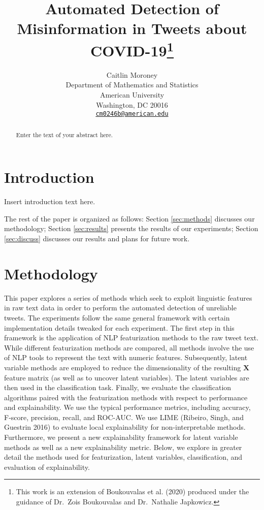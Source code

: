 \documentclass{article}
\title{Automated Detection of Misinformation in Tweets about COVID-19\footnote{This
  work is an extension of Boukouvalas et al. (2020) produced under the
  guidance of Dr.~Zois Boukouvalas and Dr.~Nathalie Japkowicz.}}
\author{
    Caitlin Moroney
   \\
    Department of Mathematics and Statistics \\
    American University \\
  Washington, DC 20016 \\
  \texttt{\href{mailto:cm0246b@american.edu}{\nolinkurl{cm0246b@american.edu}}} \\
  }
\begin{document}
\maketitle

\def\tightlist{}


\begin{abstract}
Enter the text of your abstract here.
\end{abstract}


\newpage

\hypertarget{introduction}{%
\section{Introduction}\label{introduction}}

Insert introduction text here.

The rest of the paper is organized as follows: Section \ref{sec:methods}
discusses our methodology; Section \ref{sec:results} presents the
results of our experiments; Section \ref{sec:discuss} discusses our
results and plans for future work.

\hypertarget{methodology}{%
\section{Methodology}\label{methodology}}

\label{sec:methods} This paper explores a series of methods which seek
to exploit linguistic features in raw text data in order to perform the
automated detection of unreliable tweets. The experiments follow the
same general framework with certain implementation details tweaked for
each experiment. The first step in this framework is the application of
NLP featurization methods to the raw tweet text. While different
featurization methods are compared, all methods involve the use of NLP
tools to represent the text with numeric features. Subsequently, latent
variable methods are employed to reduce the dimensionality of the
resulting \(\mathbf{X}\) feature matrix (as well as to uncover latent
variables). The latent variables are then used in the classification
task. Finally, we evaluate the classification algorithms paired with the
featurization methods with respect to performance and explainability. We
use the typical performance metrics, including accuracy, F-score,
precision, recall, and ROC-AUC. We use LIME (Ribeiro, Singh, and
Guestrin 2016) to evaluate local explainability for non-interpretable
methods. Furthermore, we present a new explainability framework for
latent variable methods as well as a new explainability metric. Below,
we explore in greater detail the methods used for featurization, latent
variables, classification, and evaluation of explainability.
\end{document}
